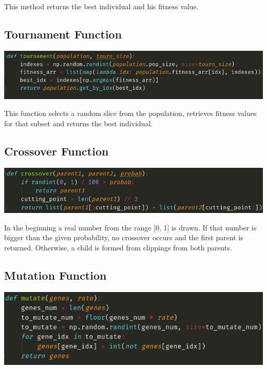 \documentclass[12pt]{article}
\begin{document}
This method returns the best individual and his fitness value.

\subsection{Tournament Function}
\begin{center}
	\includegraphics[scale=0.5]{tourn}
\end{center}

This function selects a random slice from the population, retrieves fitness values for that subset and returns the best individual.

\subsection{Crossover Function}
\begin{center}
	\includegraphics[scale=0.5]{cross}
\end{center}

In the beginning a real number from the range [0, 1] is drawn. If that number is bigger than the given probability, no crossover occurs and the first parent is returned. Otherwise, a child is formed from clippings from both parents.

\subsection{Mutation Function}
\begin{center}
	\includegraphics[scale=0.5]{mutate}
\end{center}
\end{document}
